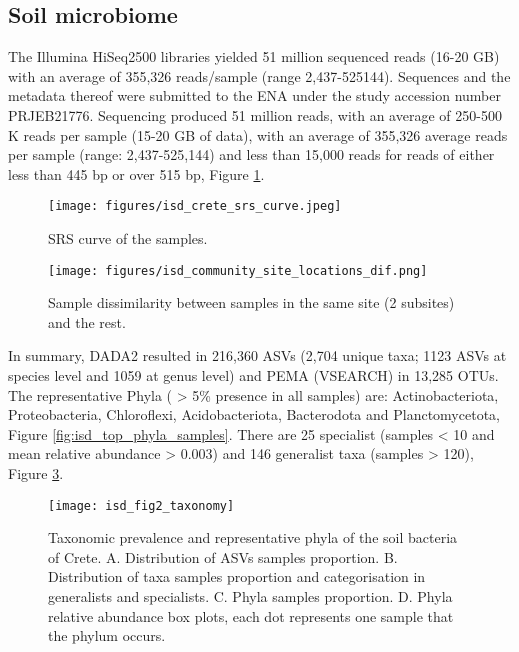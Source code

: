 \subsection{Soil microbiome}\label{soil_microbiome}

The Illumina HiSeq2500 libraries yielded 51 million sequenced reads (16-20 GB) with
an average of 355,326 reads/sample (range 2,437-525144). Sequences and the
metadata thereof were submitted to the ENA under the study accession number PRJEB21776.
Sequencing produced 51 million reads, with an average of 250-500 K reads per
sample (15-20 GB of data), with an average of 355,326 average reads per sample
(range: 2,437-525,144) and less than 15,000 reads for reads of either less than
445 bp or over 515 bp, Figure \ref{fig:isd_srs-curve_samples}.
   
   \begin{figure}[h]
      \centering
      \texttt{[image: figures/isd\_crete\_srs\_curve.jpeg]}
      \caption[SRS curve]{SRS curve of the samples. }
      \label{fig:isd_srs-curve_samples}
   \end{figure}

\begin{figure}[t] 
    \centering\texttt{[image: figures/isd\_community\_site\_locations\_dif.png]}
\caption{Sample dissimilarity between samples in the same site (2 subsites) and the rest.}
    \label{fig:isd_site_locations}
\end{figure}

In summary, DADA2 resulted in 216,360 ASVs (2,704 unique
taxa; 1123 ASVs at species level and 1059 at genus level) and
PEMA (VSEARCH) in 13,285 OTUs.
The representative Phyla ( > 5\% presence in all samples) are:
Actinobacteriota, Proteobacteria, Chloroflexi, Acidobacteriota,
Bacterodota and Planctomycetota, Figure \ref{fig:isd_top_phyla_samples}.
There are 25 specialist (samples < 10 and mean relative
abundance > 0.003) and 146 generalist taxa (samples > 120), Figure \ref{fig:isd_fig2_taxonomy}.

\begin{figure}[t] 
    \centering\texttt{[image: isd\_fig2\_taxonomy]}
    \caption{Taxonomic prevalence and representative phyla of the soil bacteria of Crete. 
    A. Distribution of ASVs samples proportion. B. Distribution of taxa samples
proportion and categorisation in generalists and specialists. C. Phyla samples proportion.
D. Phyla relative abundance box plots, each dot represents one sample that the phylum occurs.}
    \label{fig:isd_fig2_taxonomy}
\end{figure}

